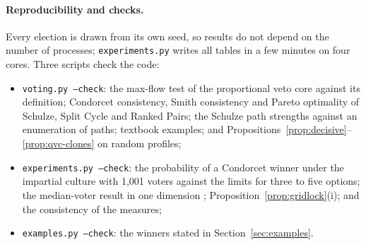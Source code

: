 \paragraph{Reproducibility and checks.} Every election is drawn from its own seed, so results do not
depend on the number of processes; \texttt{experiments.py} writes all tables in a few minutes on four cores. Three scripts check the code:
\begin{itemize}
  \item \texttt{voting.py --check}: the max-flow test of the proportional veto core against its
  definition; Condorcet consistency, Smith consistency and Pareto optimality of Schulze, Split Cycle and
  Ranked Pairs; the Schulze path strengths against an enumeration of paths; textbook examples; and
  Propositions~\ref{prop:decisive}--\ref{prop:qvc-clones} on random profiles;
  \item \texttt{experiments.py --check}: the probability of a Condorcet winner under the impartial
  culture with 1,001 voters against the limits for three to five options; the median-voter result in one
  dimension \citep{Black1948}; Proposition~\ref{prop:gridlock}(i); and the consistency of the measures;
  \item \texttt{examples.py --check}: the winners stated in Section~\ref{sec:examples}.
\end{itemize}






